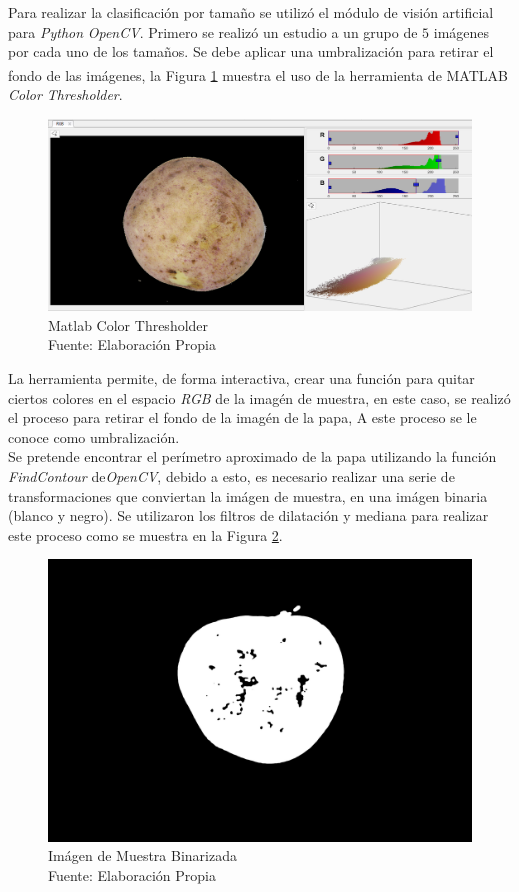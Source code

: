 Para realizar la clasificación por tamaño se utilizó el módulo de visión artificial para \textit{Python} \textit{OpenCV}. Primero se realizó un estudio a un grupo de $5$ imágenes por cada uno de los tamaños. Se debe aplicar una umbralización para retirar el fondo de las imágenes, la Figura \ref{fig:matlabcv} muestra el uso de la herramienta de MATLAB\textsuperscript{\textregistered} \textit{Color Thresholder}.


\begin{figure}[ht]
	\centering
	\includegraphics[scale=0.3]{Figs/matlabcv.png}
	\caption{Matlab Color Thresholder\\Fuente: Elaboración Propia}
	\label{fig:matlabcv}
\end{figure}

La herramienta permite, de forma interactiva, crear una función para quitar ciertos colores en el espacio \textit{RGB} de la imagén de muestra, en este caso, se realizó el proceso para retirar el fondo de la imagén de la papa, A este proceso se le conoce como umbralización. \\

Se pretende encontrar el perímetro aproximado de la papa utilizando la función \textit{FindContour} de\textit{OpenCV}, debido a esto, es necesario realizar una serie de transformaciones que conviertan la imágen de muestra, en una imágen binaria (blanco y negro). Se utilizaron los filtros de dilatación y mediana para realizar este proceso como se muestra en la Figura \ref{fig:dilmed}.	

\begin{figure}[ht]
	\centering
	\includegraphics[scale=0.04]{Figs/dilmed.png}
	\caption{Imágen de Muestra Binarizada\\Fuente: Elaboración Propia}
	\label{fig:dilmed}
\end{figure}

